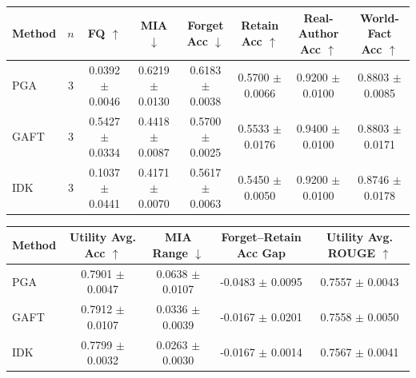 \begin{tabular}{lccccccc}
\hline
Method & $n$ & FQ $\uparrow$ & MIA $\downarrow$ & Forget Acc $\downarrow$ & Retain Acc $\uparrow$ & Real-Author Acc $\uparrow$ & World-Fact Acc $\uparrow$ \\
\hline
PGA & 3 & 0.0392 $\pm$ 0.0046 & 0.6219 $\pm$ 0.0130 & 0.6183 $\pm$ 0.0038 & 0.5700 $\pm$ 0.0066 & 0.9200 $\pm$ 0.0100 & 0.8803 $\pm$ 0.0085 \\
GAFT & 3 & 0.5427 $\pm$ 0.0334 & 0.4418 $\pm$ 0.0087 & 0.5700 $\pm$ 0.0025 & 0.5533 $\pm$ 0.0176 & 0.9400 $\pm$ 0.0100 & 0.8803 $\pm$ 0.0171 \\
IDK & 3 & 0.1037 $\pm$ 0.0441 & 0.4171 $\pm$ 0.0070 & 0.5617 $\pm$ 0.0063 & 0.5450 $\pm$ 0.0050 & 0.9200 $\pm$ 0.0100 & 0.8746 $\pm$ 0.0178 \\
\hline
\end{tabular}

\begin{tabular}{lcccc}
\hline
Method & Utility Avg. Acc $\uparrow$ & MIA Range $\downarrow$ & Forget--Retain Acc Gap & Utility Avg. ROUGE $\uparrow$ \\
\hline
PGA & 0.7901 $\pm$ 0.0047 & 0.0638 $\pm$ 0.0107 & -0.0483 $\pm$ 0.0095 & 0.7557 $\pm$ 0.0043 \\
GAFT & 0.7912 $\pm$ 0.0107 & 0.0336 $\pm$ 0.0039 & -0.0167 $\pm$ 0.0201 & 0.7558 $\pm$ 0.0050 \\
IDK & 0.7799 $\pm$ 0.0032 & 0.0263 $\pm$ 0.0030 & -0.0167 $\pm$ 0.0014 & 0.7567 $\pm$ 0.0041 \\
\hline
\end{tabular}
